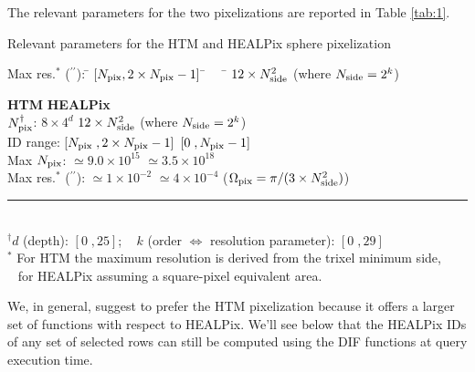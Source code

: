 \documentclass[10pt,titlepage]{article}
\begin{document}
The relevant parameters for the two pixelizations are reported in Table
\ref{tab:1}.
%
\begin{table}[tbp]
\centering
\caption{Relevant parameters for the HTM and HEALPix sphere pixelization}
\label{tab:1}
\begin{tabbing}
%
Max res.$^*$ ($^{\prime\prime}$): \= $[N_{\rm pix} , 2\times N_{\rm pix}-1]$ \=
~~ \= $12 \times N_{\rm side}^2$ (where $N_{\rm side} = 2^k$) \kill

 \> \textbf{HTM}  \> \> \textbf{HEALPix}  \\
$N_{\rm pix}^\dagger$: \> $8\times 4^d$ \> \>
   $12 \times N_{\rm side}^2$ (where $N_{\rm side} = 2^k$)\\
ID range: \> $[N_{\rm pix}\;, 2\times N_{\rm pix}-1]$ \> \>
     $[0\;, N_{\rm pix}-1]$ \\
Max $N_{\rm pix}$: \> $\simeq 9.0\times 10^{15}$ \> \> $\simeq 3.5\times
10^{18}$ \\
Max res.$^*$ ($^{\prime\prime}$): \> $\simeq 1\times 10^{-2}$ \> \> $\simeq 4\times
10^{-4}$
 ($\Omega_{\rm pix} = \pi/(3\times N_{\rm side}^2)$) \\
%
\rule{100pt}{0.4pt}
\\
$^\dagger d$ (depth): $[0\;, 25]$; ~
 $k$ (order $\Leftrightarrow$ resolution parameter): $[0\;, 29]$ \\
$^*$ For HTM the maximum resolution is derived from the trixel minimum side, \\
~ for HEALPix assuming a square-pixel equivalent area.
\end{tabbing}
\end{table}
%
We, in general, suggest to
prefer the HTM pixelization because it offers a larger set of functions with
respect to HEALPix. We'll see below that the HEALPix IDs of any set of
selected rows can still be computed using the DIF functions at query execution
time.
\end{document}
